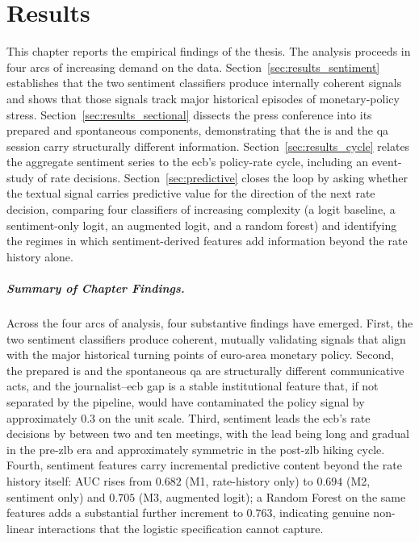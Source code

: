 \chapter{Results}\label{ch:results}

This chapter reports the empirical findings of the thesis. The analysis proceeds in four arcs of increasing demand on the data. Section~\ref{sec:results_sentiment} establishes that the two sentiment classifiers produce internally coherent signals and shows that those signals track major historical episodes of monetary-policy stress. Section~\ref{sec:results_sectional} dissects the press conference into its prepared and spontaneous components, demonstrating that the \gls{is} and the \gls{qa} session carry structurally different information. Section~\ref{sec:results_cycle} relates the aggregate sentiment series to the \gls{ecb}'s policy-rate cycle, including an event-study of rate decisions. Section~\ref{sec:predictive} closes the loop by asking whether the textual signal carries predictive value for the direction of the next rate decision, comparing four classifiers of increasing complexity (a logit baseline, a sentiment-only logit, an augmented logit, and a random forest) and identifying the regimes in which sentiment-derived features add information beyond the rate history alone.







\paragraph{Summary of Chapter Findings.} Across the four arcs of analysis, four substantive findings have emerged. First, the two sentiment classifiers produce coherent, mutually validating signals that align with the major historical turning points of euro-area monetary policy. Second, the prepared \gls{is} and the spontaneous \gls{qa} are structurally different communicative acts, and the journalist--\gls{ecb} gap is a stable institutional feature that, if not separated by the pipeline, would have contaminated the policy signal by approximately $0.3$ on the unit scale. Third, sentiment leads the \gls{ecb}'s rate decisions by between two and ten meetings, with the lead being long and gradual in the pre-\gls{zlb} era and approximately symmetric in the post-\gls{zlb} hiking cycle. Fourth, sentiment features carry incremental predictive content beyond the rate history itself: AUC rises from $0.682$ (M1, rate-history only) to $0.694$ (M2, sentiment only) and $0.705$ (M3, augmented logit); a Random Forest on the same features adds a substantial further increment to $0.763$, indicating genuine non-linear interactions that the logistic specification cannot capture.